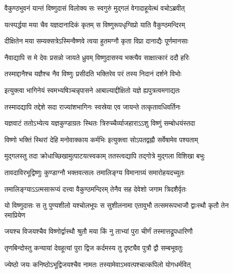 \twolineshloka
{वैकुण्ठभुवनं यान्तं विष्णुदासं विलोक्य सः}
{स्वगुरुं मुद्गलं वेगादाहूयेत्थं वचोऽब्रवीत्} %


\twolineshloka
{यत्स्पर्द्धया मया चैव यज्ञदानादिकं कृतम्}
{स विष्णुरूपधृग्विप्रो याति वैकुण्ठमन्दिरम्} %

\twolineshloka
{दीक्षितेन मया सम्यक्सत्रेऽस्मिन्वैष्णवे त्वया}
{हुतमग्नौ कृता विप्रा दानाद्यैः पूर्णमानसाः} %

\twolineshloka
{नैवाद्यापि स मे देवः प्रसन्नो जायते ध्रुवम्}
{विष्णुदासस्य भक्त्यैव साक्षात्कारं ददौ हरिः} %

\twolineshloka
{तस्माद्दानैश्च यज्ञैश्च नैव विष्णुः प्रसीदति}
{भक्तिरेव परं तस्य निदानं दर्शने विभोः} %


\twolineshloka
{इत्युक्त्वा भागिनेयं स्वमभ्यषिञ्चन्नृपासने}
{आबाल्याद्दीक्षितो यज्ञे ह्यपुत्रत्वमगाद्यतः} %


\twolineshloka
{तस्मादद्यापि तद्देशे सदा राज्यांशभागिनः}
{स्वस्रेया एव जायन्ते तत्कृतावधिवर्तिनः} %

\twolineshloka
{यज्ञवाटं ततोऽभ्येत्य यज्ञकुण्डाग्रतः स्थितः}
{त्रिरुच्चैर्व्याजहाराऽऽशु विष्णुं सम्बोधयंस्तदा} %

\twolineshloka
{विष्णो भक्तिं स्थिरां देहि मनोवाक्काय कर्मभिः}
{इत्युक्त्वा सोऽपतद्वह्नौ सर्वेषामेव पश्यताम्} %

\twolineshloka
{मुद्गलस्तु तदा क्रोधाच्छिखामुत्पाटयत्स्वकाम्}
{ततस्त्वद्यापि तद्गोत्रे मुद्गला विशिखा बभुः} %

\twolineshloka
{तावदाविरभूद्विष्णुः कुण्डाग्नौ भक्तवत्सलः}
{तमालिङ्ग्य विमानाग्र्यं समारोहयदच्युतः} %

\twolineshloka
{तमालिङ्ग्याऽऽत्मसारूप्यं दत्त्वा वैकुण्ठमन्दिरम्}
{तेनैव सह देवेशो जगाम त्रिदशैर्वृतः} %


\twolineshloka
{यो विष्णुदासः स तु पुण्यशीलो यश्चोलभूपः स सुशीलनामा}
{एतावुभौ तत्समरूपभाजौ द्वाःस्थौ कृतौ तेन रमाप्रियेण} %





\twolineshloka
{जयश्च विजयश्चैव विष्णोर्द्वास्थौ श्रुतौ मया}
{किं नु ताभ्यां पुरा चीर्णं तस्मात्तद्रूपधारिणौ} %


\twolineshloka
{तृणबिन्दोस्तु कन्यायां देवहूत्यां पुरा द्विज}
{कर्दमस्य तु दृष्ट्यैव पुत्रौ द्वौ सम्बभूवतुः} %


\twolineshloka
{ज्येष्ठो जयः कनिष्ठोऽभूद्विजयश्चैव नामतः}
{तस्यामेवाऽभवत्पश्चात्कपिलो योगधर्मवित्} %

